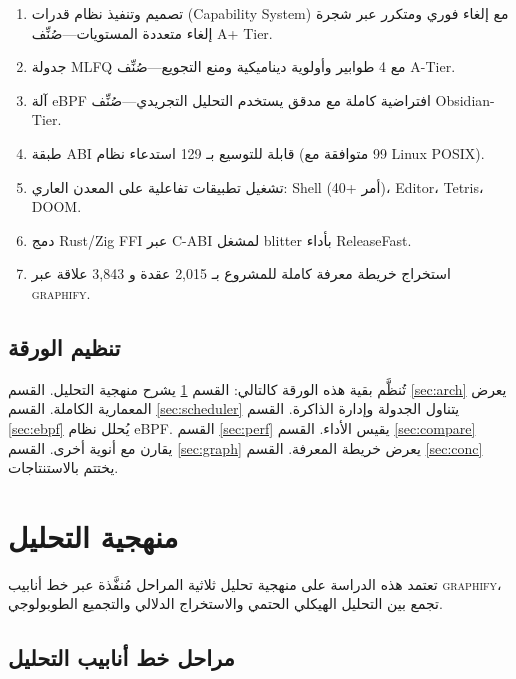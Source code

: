 \documentclass[12pt,a4paper]{article}
\theoremstyle{definition}
\newcommand{\en}[1]{\textenglish{#1}}
\begin{document}
\begin{definitionbox}
\begin{enumerate}[label=\textbf{C\arabic*.}, leftmargin=3em]
\item تصميم وتنفيذ نظام قدرات (Capability System) مع إلغاء فوري ومتكرر عبر شجرة إلغاء متعددة المستويات---صُنِّف \en{A+ Tier}.
\item جدولة \en{MLFQ} مع 4 طوابير وأولوية ديناميكية ومنع التجويع---صُنِّف \en{A-Tier}.
\item آلة eBPF افتراضية كاملة مع مدقق يستخدم التحليل التجريدي---صُنِّف \en{Obsidian-Tier}.
\item طبقة \en{ABI} قابلة للتوسيع بـ 129 استدعاء نظام (99 متوافقة مع \en{Linux} \en{POSIX}).
\item تشغيل تطبيقات تفاعلية على المعدن العاري: \en{Shell} (40+ أمر)، \en{Editor}، \en{Tetris}، \en{DOOM}.
\item دمج \en{Rust/Zig FFI} عبر \en{C-ABI} لمشغل \en{blitter} بأداء \en{ReleaseFast}.
\item استخراج خريطة معرفة كاملة للمشروع بـ 2,015 عقدة و 3,843 علاقة عبر \textsc{graphify}.
\end{enumerate}
\end{definitionbox}

\subsection{تنظيم الورقة}

تُنظَّم بقية هذه الورقة كالتالي: القسم \ref{sec:method} يشرح منهجية التحليل. القسم \ref{sec:arch} يعرض المعمارية الكاملة. القسم \ref{sec:scheduler} يتناول الجدولة وإدارة الذاكرة. القسم \ref{sec:ebpf} يُحلل نظام eBPF. القسم \ref{sec:perf} يقيس الأداء. القسم \ref{sec:compare} يقارن مع أنوية أخرى. القسم \ref{sec:graph} يعرض خريطة المعرفة. القسم \ref{sec:conc} يختتم بالاستنتاجات.

\newpage

\section{منهجية التحليل}\label{sec:method}

تعتمد هذه الدراسة على منهجية تحليل ثلاثية المراحل مُنفَّذة عبر خط أنابيب \textsc{graphify}، تجمع بين التحليل الهيكلي الحتمي والاستخراج الدلالي والتجميع الطوبولوجي.

\subsection{مراحل خط أنابيب التحليل}
\end{document}
